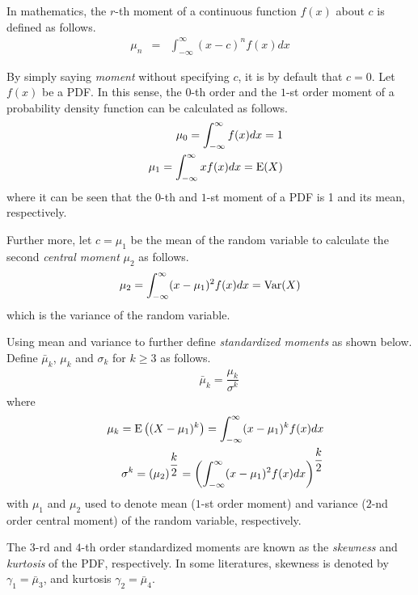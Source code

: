 In mathematics, the $r$-th moment of a continuous function $f(x)$ about $c$ is defined as follows.
\begin{eqnarray}
  \mu_n &=& \int_{-\infty}^{\infty}(x-c)^nf(x)dx \nonumber
\end{eqnarray}

By simply saying \textit{moment} without specifying $c$, it is by default that $c=0$. Let $f(x)$ be a PDF. In this sense, the $0$-th order and the $1$-st order moment of a probability density function can be calculated as follows.
\begin{eqnarray}
  && \mu_0 = \int_{-\infty}^{\infty}f(x)dx = 1 \nonumber \\
  && \mu_1 = \int_{-\infty}^{\infty}xf(x)dx = \textup{E}(X) \nonumber
\end{eqnarray}
where it can be seen that the $0$-th and $1$-st moment of a PDF is 1 and its mean, respectively.

Further more, let $c=\mu_1$ be the mean of the random variable to calculate the second \textit{central moment} $\mu_2$ as follows.
\begin{eqnarray}
  \mu_2 = \int_{-\infty}^{\infty}(x-\mu_1)^2f(x)dx = \textup{Var}(X) \nonumber
\end{eqnarray}
which is the variance of the random variable.

Using mean and variance to further define \textit{standardized moments} as shown below. Define $\bar{\mu}_k$, $\mu_k$ and $\sigma_k$ for $k\geq 3$ as follows.
\begin{eqnarray}
  && \bar{\mu}_k = \dfrac{\mu_k}{\sigma^k} \nonumber
\end{eqnarray}
where
\begin{eqnarray}
	&& \mu_k = \textup{E}\left((X-\mu_1)^k\right) = \int_{-\infty}^{\infty}(x-\mu_1)^kf(x)dx \nonumber \\
	&& \sigma^k = \left(\mu_2\right)^{\dfrac{k}{2}} = \left(\int_{-\infty}^{\infty}(x-\mu_1)^2f(x)dx\right)^{\dfrac{k}{2}} \nonumber
\end{eqnarray}
with $\mu_1$ and $\mu_2$ used to denote mean ($1$-st order moment) and variance ($2$-nd order central moment) of the random variable, respectively.

The $3$-rd and $4$-th order standardized moments are known as the \textit{skewness} and \textit{kurtosis} of the PDF, respectively. In some literatures, skewness is denoted by $\gamma_1 = \bar{\mu}_3$, and kurtosis $\gamma_2 = \bar{\mu}_4$.

